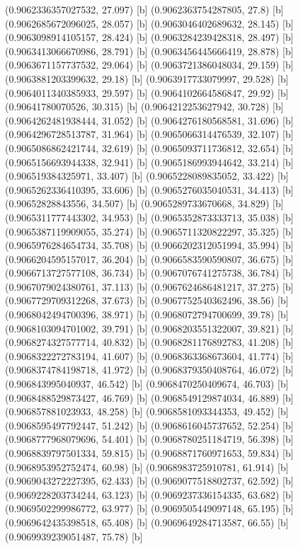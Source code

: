 {{{(0.9062336357027532, 27.097) [b] 
(0.9062363754287805, 27.8) [b] 
(0.9062685672096025, 28.057) [b] 
(0.9063046402689632, 28.145) [b] 
(0.9063098914105157, 28.424) [b] 
(0.9063284239428318, 28.497) [b] 
(0.9063413066670986, 28.791) [b] 
(0.9063456445666419, 28.878) [b] 
(0.9063671157737532, 29.064) [b] 
(0.9063721386048034, 29.159) [b] 
(0.9063881203399632, 29.18) [b] 
(0.9063917733079997, 29.528) [b] 
(0.9064011340385933, 29.597) [b] 
(0.9064102664586847, 29.92) [b] 
(0.90641780070526, 30.315) [b] 
(0.9064212253627942, 30.728) [b] 
(0.9064262481938444, 31.052) [b] 
(0.9064276180568581, 31.696) [b] 
(0.9064296728513787, 31.964) [b] 
(0.9065066314476539, 32.107) [b] 
(0.9065086862421744, 32.619) [b] 
(0.9065093711736812, 32.654) [b] 
(0.9065156693944338, 32.941) [b] 
(0.9065186993944642, 33.214) [b] 
(0.906519384325971, 33.407) [b] 
(0.9065228089835052, 33.422) [b] 
(0.9065262336410395, 33.606) [b] 
(0.9065276035040531, 34.413) [b] 
(0.90652828843556, 34.507) [b] 
(0.9065289733670668, 34.829) [b] 
(0.9065311777443302, 34.953) [b] 
(0.9065352873333713, 35.038) [b] 
(0.9065387119909055, 35.274) [b] 
(0.9065711320822297, 35.325) [b] 
(0.9065976284654734, 35.708) [b] 
(0.9066202312051994, 35.994) [b] 
(0.9066204595157017, 36.204) [b] 
(0.9066583590590807, 36.675) [b] 
(0.9066713727577108, 36.734) [b] 
(0.9067076741275738, 36.784) [b] 
(0.9067079024380761, 37.113) [b] 
(0.9067624686481217, 37.275) [b] 
(0.9067729709312268, 37.673) [b] 
(0.9067752540362496, 38.56) [b] 
(0.9068042494700396, 38.971) [b] 
(0.9068072794700699, 39.78) [b] 
(0.9068103094701002, 39.791) [b] 
(0.9068203551322007, 39.821) [b] 
(0.9068274327577714, 40.832) [b] 
(0.9068281176892783, 41.208) [b] 
(0.9068322272783194, 41.607) [b] 
(0.9068363368673604, 41.774) [b] 
(0.9068374784198718, 41.972) [b] 
(0.9068379350408764, 46.072) [b] 
(0.906843995040937, 46.542) [b] 
(0.9068470250409674, 46.703) [b] 
(0.9068488529873427, 46.769) [b] 
(0.9068549129874034, 46.889) [b] 
(0.906857881023933, 48.258) [b] 
(0.9068581093344353, 49.452) [b] 
(0.9068595497792447, 51.242) [b] 
(0.9068616045737652, 52.254) [b] 
(0.9068777968079696, 54.401) [b] 
(0.9068780251184719, 56.398) [b] 
(0.9068839797501334, 59.815) [b] 
(0.9068871760971653, 59.834) [b] 
(0.9068953952752474, 60.98) [b] 
(0.9068983725910781, 61.914) [b] 
(0.9069043272227395, 62.433) [b] 
(0.9069077518802737, 62.592) [b] 
(0.9069228203734244, 63.123) [b] 
(0.9069237336154335, 63.682) [b] 
(0.9069502299986772, 63.977) [b] 
(0.9069505449097148, 65.195) [b] 
(0.9069642435398518, 65.408) [b] 
(0.9069649284713587, 66.55) [b] 
(0.9069939239051487, 75.78) [b] 
}}}
